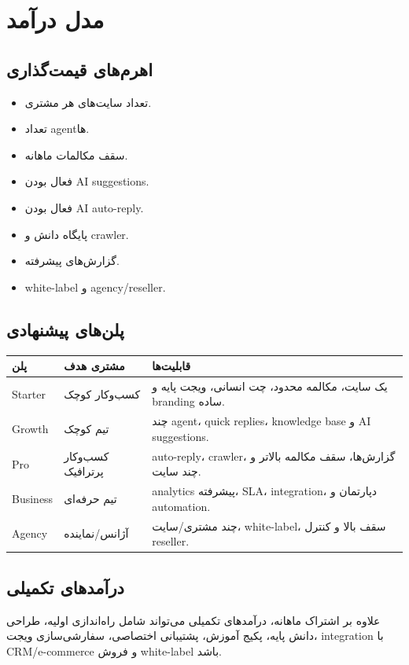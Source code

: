 \documentclass[12pt,a4paper]{article}
\begin{document}
\section{مدل درآمد}
\subsection{اهرم‌های قیمت‌گذاری}
\begin{itemize}
  \item تعداد سایت‌های هر مشتری.
  \item تعداد agentها.
  \item سقف مکالمات ماهانه.
  \item فعال بودن AI suggestions.
  \item فعال بودن AI auto-reply.
  \item پایگاه دانش و crawler.
  \item گزارش‌های پیشرفته.
  \item white-label و agency/reseller.
\end{itemize}

\subsection{پلن‌های پیشنهادی}
\begin{longtable}{R{28mm} R{38mm} R{76mm}}
\toprule
\textbf{پلن} & \textbf{مشتری هدف} & \textbf{قابلیت‌ها} \\
\midrule
\endhead
Starter & کسب‌وکار کوچک & یک سایت، مکالمه محدود، چت انسانی، ویجت پایه و branding ساده. \\
Growth & تیم کوچک & چند agent، quick replies، knowledge base و AI suggestions. \\
Pro & کسب‌وکار پرترافیک & auto-reply، crawler، گزارش‌ها، سقف مکالمه بالاتر و چند سایت. \\
Business & تیم حرفه‌ای & analytics پیشرفته، SLA، integration، دپارتمان و automation. \\
Agency & آژانس/نماینده & چند مشتری/سایت، white-label، سقف بالا و کنترل reseller. \\
\bottomrule
\end{longtable}

\subsection{درآمدهای تکمیلی}
علاوه بر اشتراک ماهانه، درآمدهای تکمیلی می‌تواند شامل راه‌اندازی اولیه، طراحی دانش پایه، پکیج آموزش، پشتیبانی اختصاصی، سفارشی‌سازی ویجت، integration با CRM/e-commerce و فروش white-label باشد.
\end{document}
